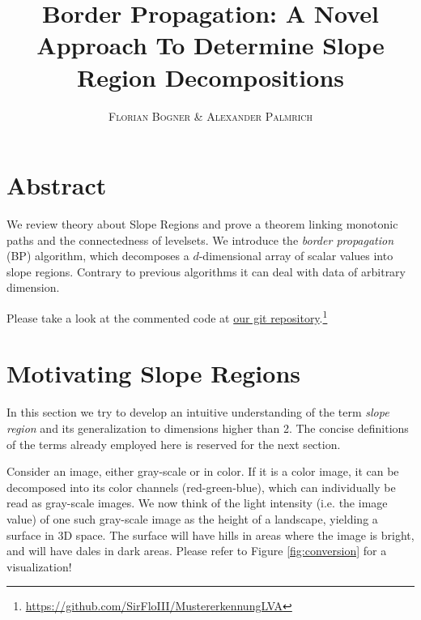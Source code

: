 \documentclass[a4paper,12pt,notitlepage,fullpage]{paper}
\makeatletter
\theoremstyle{plain}
\theoremstyle{definition}
\newcommand*{\toccontents}{\@starttoc{toc}}
\makeatother
\begin{document}
\author{\textsc{Florian Bogner} \& \textsc{Alexander Palmrich}}
\title{Border Propagation: A Novel Approach To Determine Slope Region Decompositions}
\maketitle

\toccontents
%
%
%

\section{Abstract}

We review theory about Slope Regions and prove a theorem linking monotonic paths and the connectedness of levelsets. We introduce the \emph{border propagation} (BP) algorithm, which decomposes a $d$-dimensional array of scalar values into slope regions. Contrary to previous algorithms it can deal with data of arbitrary dimension.



Please take a look at the commented code at \href{https://github.com/SirFloIII/MustererkennungLVA}{our git repository}.\footnote{\url{https://github.com/SirFloIII/MustererkennungLVA}}

\section{Motivating Slope Regions}

In this section we try to develop an intuitive understanding of the term \emph{slope region} and its generalization to dimensions higher than 2. The concise definitions of the terms already employed here is reserved for the next section.

Consider an image, either gray-scale or in color. If it is a color image, it can be decomposed into its color channels (red-green-blue), which can individually be read as gray-scale images. We now think of the light intensity (i.e. the image value) of one such gray-scale image as the height of a landscape, yielding a surface in 3D space. The surface will have hills in areas where the image is bright, and will have dales in dark areas. Please refer to Figure \ref{fig:conversion} for a visualization!
\end{document}
